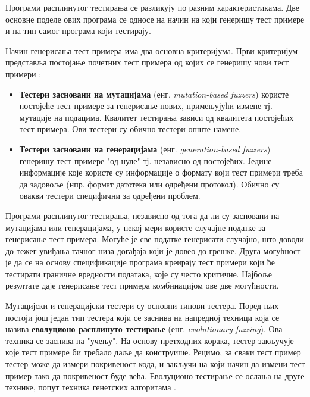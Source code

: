 \documentclass[12pt,oneside]{memoir}
\begin{document}
Програми расплинутог тестирања се разликују по разним карактеристикама. Две основне поделе ових програма се односе на начин на који генеришу тест примере и на тип самог програма који тестирају.

Начин генерисања тест примера има два основна критеријума.
Први критеријум представља постојање почетних тест примера од којих се генеришу нови тест примери \cite{fuzzingBrute, fuzzing}:
\begin{itemize}
\item \textbf{Тестери засновани на мутацијама} (енг. \textit{mutation-based fuzzers}) користе постојеће тест примере за генерисање нових, примењујући измене тј. мутације на подацима. Квалитет тестирања зависи од квалитета постојећих тест примера. Ови тестери су обично тестери опште намене. 
\item \textbf{Тестери засновани на генерацијама} (енг. \textit{generation-based fuzzers}) генеришу тест примере "од нуле" тј. независно од постојећих. Једине информације које користе су информације о формату који тест примери треба да задовоље (нпр. формат датотека или одређени протокол). Обично су овакви тестери специфични за одређени проблем.
\end{itemize}

Програми расплинутог тестирања, независно од тога да ли су засновани на мутацијама или генерацијама, у некој мери користе случајне податке за генерисање тест примера. Могуће је све податке генерисати случајно, што доводи до тежег увиђања тачног низа догађаја који је довео до грешке. Друга могућност је да се на основу спецификације програма креирају тест примери који ће тестирати граничне вредности података, које су често критичне. Најбоље резултате даје генерисање тест примера комбинацијом ове две могућности.

Мутацијски и генерацијски тестери су основни типови тестера. Поред њих постоји још један тип тестера који се заснива на напредној техници која се назива \textbf{еволуционо расплинуто тестирање} (енг. \textit{evolutionary fuzzing}). Ова техника се заснива на "учењу". На основу претходних корака, тестер закључује које тест примере би требало даље да конструише. Рецимо, за сваки тест пример тестер може да измери покривеност кода, и закључи на који начин да измени тест пример тако да покривеност буде већа. Еволуционо тестирање се ослања на друге технике, попут техника генетских алгоритама \cite{fuzzing, 15minuteGuide}.
\end{document}
